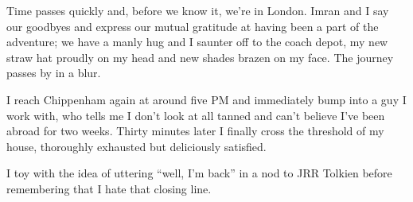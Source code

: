 \documentclass[a5paper,titlepage,11pt,draft]{book}
\begin{document}
Time passes quickly and, before we know it, we're in London.  Imran and I say our goodbyes and express our mutual gratitude at having been a part of the adventure; we have a manly hug and I saunter off to the coach depot, my new straw hat proudly on my head and new shades brazen on my face.  The journey passes by in a blur.

I reach Chippenham again at around five PM and immediately bump into a guy I work with, who tells me I don't look at all tanned and can't believe I've been abroad for two weeks.  Thirty minutes later I finally cross the threshold of my house, thoroughly exhausted but deliciously satisfied.

I toy with the idea of uttering ``well, I'm back'' in a nod to JRR Tolkien before remembering that I hate that closing line.
\end{document}
